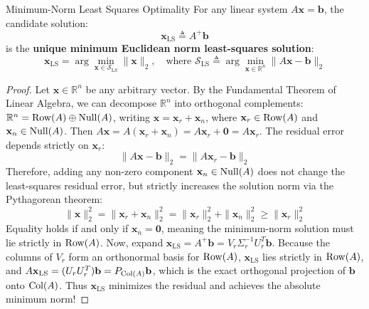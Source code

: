 \begin{theorembox}{Minimum-Norm Least Squares Optimality}
For any linear system $A\mathbf{x} = \mathbf{b}$, the candidate solution:
\begin{equation}
\mathbf{x}_{\text{LS}} \triangleq A^+ \mathbf{b}
\end{equation}
is the \textbf{unique minimum Euclidean norm least-squares solution}:
\begin{equation}
\mathbf{x}_{\text{LS}} = \arg\min_{\mathbf{x} \in \mathcal{S}_{\text{LS}}} \|\mathbf{x}\|_2, \quad \text{where } \mathcal{S}_{\text{LS}} \triangleq \arg\min_{\mathbf{x} \in \mathbb{R}^n} \|A\mathbf{x} - \mathbf{b}\|_2
\label{eq:min_norm_ls_opt}
\end{equation}
\end{theorembox}

\begin{proof}
Let $\mathbf{x} \in \mathbb{R}^n$ be any arbitrary vector. By the Fundamental Theorem of Linear Algebra, we can decompose $\mathbb{R}^n$ into orthogonal complements: $\mathbb{R}^n = \operatorname{Row}(A) \oplus \operatorname{Null}(A)$, writing $\mathbf{x} = \mathbf{x}_r + \mathbf{x}_n$, where $\mathbf{x}_r \in \operatorname{Row}(A)$ and $\mathbf{x}_n \in \operatorname{Null}(A)$.
Then $A\mathbf{x} = A(\mathbf{x}_r + \mathbf{x}_n) = A\mathbf{x}_r + \mathbf{0} = A\mathbf{x}_r$.
The residual error depends strictly on $\mathbf{x}_r$:
\begin{equation}
\|A\mathbf{x} - \mathbf{b}\|_2 = \|A\mathbf{x}_r - \mathbf{b}\|_2
\end{equation}
Therefore, adding any non-zero component $\mathbf{x}_n \in \operatorname{Null}(A)$ does not change the least-squares residual error, but strictly increases the solution norm via the Pythagorean theorem:
\begin{equation}
\|\mathbf{x}\|_2^2 = \|\mathbf{x}_r + \mathbf{x}_n\|_2^2 = \|\mathbf{x}_r\|_2^2 + \|\mathbf{x}_n\|_2^2 \ge \|\mathbf{x}_r\|_2^2
\end{equation}
Equality holds if and only if $\mathbf{x}_n = \mathbf{0}$, meaning the minimum-norm solution must lie strictly in $\operatorname{Row}(A)$.
Now, expand $\mathbf{x}_{\text{LS}} = A^+ \mathbf{b} = V_r \Sigma_r^{-1} U_r^T \mathbf{b}$. Because the columns of $V_r$ form an orthonormal basis for $\operatorname{Row}(A)$, $\mathbf{x}_{\text{LS}}$ lies strictly in $\operatorname{Row}(A)$, and $A \mathbf{x}_{\text{LS}} = (U_r U_r^T) \mathbf{b} = P_{\operatorname{Col}(A)}\mathbf{b}$, which is the exact orthogonal projection of $\mathbf{b}$ onto $\operatorname{Col}(A)$. Thus $\mathbf{x}_{\text{LS}}$ minimizes the residual and achieves the absolute minimum norm!
\end{proof}

